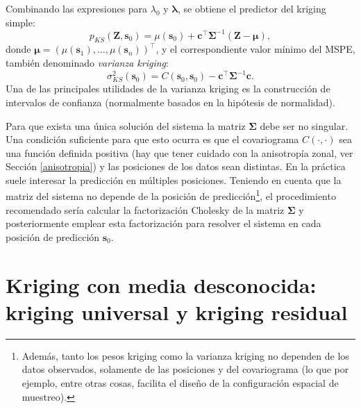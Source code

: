 \documentclass[
  spanish,
]{book}
\theoremstyle{break}
\theoremstyle{definition}
\theoremstyle{definition}
\theoremstyle{definition}
\theoremstyle{definition}
\theoremstyle{remark}
\begin{document}
Combinando las expresiones para \(\lambda_{0}\) y \(\boldsymbol{\lambda}\), se obtiene el predictor del kriging simple:
\[p_{KS}(\mathbf{Z}, \mathbf{s}_{0}) = \mu(\mathbf{s}_{0}) + \mathbf{c^\top }\boldsymbol{\Sigma}^{-1} (\mathbf{Z}-\boldsymbol{\mu}),\]
donde \(\boldsymbol{\mu}=\left( \mu(\mathbf{s}_{1}), \ldots,\mu(\mathbf{s}_{n} )\right)^\top\), y el correspondiente valor mínimo del MSPE, también denominado \emph{varianza kriging}:
\[\sigma_{KS}^{2} (\mathbf{s}_{0})=C(\mathbf{s}_{0},\mathbf{s}_{0}
)-\mathbf{c^\top }\boldsymbol{\Sigma}^{-1} \mathbf{c}.\]
Una de las principales utilidades de la varianza kriging es la construcción de intervalos de confianza (normalmente basados en la hipótesis de normalidad).

Para que exista una única solución del sistema la matriz \(\boldsymbol{\Sigma}\) debe ser no singular.
Una condición suficiente para que esto ocurra es que el covariograma \(C(\cdot ,\cdot)\) sea una función definida positiva (hay que tener cuidado con la anisotropía zonal, ver Sección \ref{anisotropia}) y las posiciones de los datos sean distintas.
En la práctica suele interesar la predicción en múltiples posiciones.
Teniendo en cuenta que la matriz del sistema no depende de la posición
de predicción\footnote{Además, tanto los pesos kriging como la varianza kriging no dependen de los datos observados, solamente de las posiciones y del covariograma (lo que por ejemplo, entre otras cosas, facilita el diseño de la configuración espacial de muestreo).}, el procedimiento recomendado sería calcular la factorización Cholesky de la matriz \(\boldsymbol{\Sigma}\) y posteriormente emplear esta factorización para resolver el sistema en cada posición de predicción \(\mathbf{s}_{0}\).

\hypertarget{kuniversal}{%
\section{Kriging con media desconocida: kriging universal y kriging residual}\label{kuniversal}}
\end{document}
